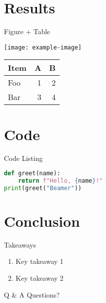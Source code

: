 \documentclass[aspectratio=169,11pt]{beamer}
\begin{document}
\section{Results}
\begin{frame}{Figure + Table}
  \begin{minipage}{0.55\textwidth}
    \centering
    \texttt{[image: example-image]} %
  \end{minipage}\hfill
  \begin{minipage}{0.4\textwidth}
    \begin{tabular}{lrr}
      \toprule
      Item & A & B \\
      \midrule
      Foo  & 1 & 2 \\
      Bar  & 3 & 4 \\
      \bottomrule
    \end{tabular}
  \end{minipage}
\end{frame}






\section{Code}
\begin{frame}[fragile]{Code Listing}
\begin{lstlisting}[language=Python,basicstyle=\ttfamily\small,frame=single]
def greet(name):
    return f"Hello, {name}!"
print(greet("Beamer"))
\end{lstlisting}
\end{frame}

\section{Conclusion}
\begin{frame}{Takeaways}
  \begin{enumerate}
    \item Key takeaway 1
    \item Key takeaway 2
  \end{enumerate}
\end{frame}

\begin{frame}{Q \& A}
  \centering
  \Huge Questions?
\end{frame}
\end{document}
